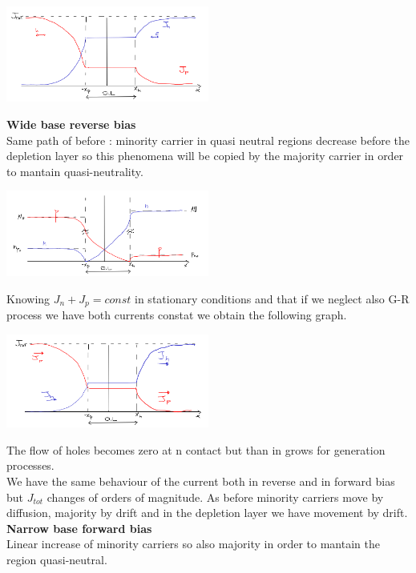 \centering
\includegraphics[width=0.5\textwidth]{wbfbJ.png}\\
\raggedright

{\bf Wide base reverse bias}\\
Same path of before : minority carrier in quasi neutral regions decrease before the depletion layer so this phenomena will be copied by the majority carrier in order to mantain quasi-neutrality.

\centering
\includegraphics[width=0.5\textwidth]{rbwb.png}\\
\raggedright

Knowing $J_n+J_p=const$ in stationary conditions and that if we neglect also G-R process we have both currents constat we obtain the following graph.

\centering
\includegraphics[width=0.5\textwidth]{wbrb.png}\\
\raggedright

The flow of holes becomes zero at n contact but than in grows for generation processes.\\
We have the same behaviour of the current both in reverse and in forward bias but $J_{tot}$ changes of orders of magnitude. As before minority carriers move by diffusion, majority by drift and in the depletion layer we have movement by drift.\\

{\bf Narrow base forward bias}\\
Linear increase of minority carriers so also majority in order to mantain the region quasi-neutral.\\

